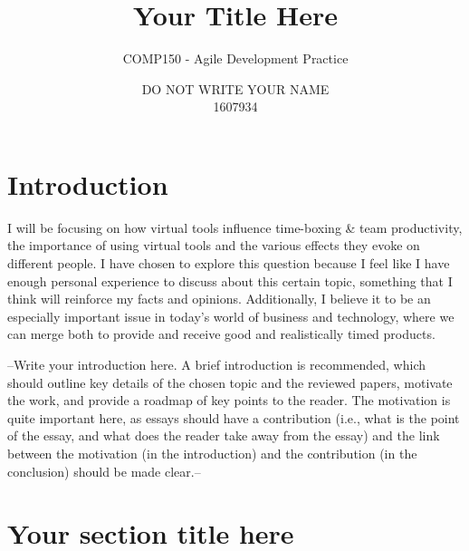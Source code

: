 \documentclass{scrartcl}
\title{Your Title Here}
\subtitle{COMP150 - Agile Development Practice}
\author{DO NOT WRITE YOUR NAME\\1607934}
\begin{document}
\maketitle


\section{Introduction}

I will be focusing on how virtual tools influence time-boxing & team productivity, the importance of using virtual tools and the various effects they evoke on different people. I have chosen to explore this question because I feel like I have enough personal experience to discuss about this certain topic, something that I think will reinforce my facts and opinions. Additionally, I believe it to be an especially important issue in today's world of business and technology, where we can merge both to provide and receive good and realistically timed products.

--Write your introduction here. A brief introduction is recommended, which should outline key details of the chosen topic and the reviewed papers, motivate the work, and provide a roadmap of key points to the reader. The motivation is quite important here, as essays should have a contribution (i.e., what is the point of the essay, and what does the reader take away from the essay) and the link between the motivation (in the introduction) and the contribution (in the conclusion) should be made clear.--

\section{Your section title here}
\end{document}
